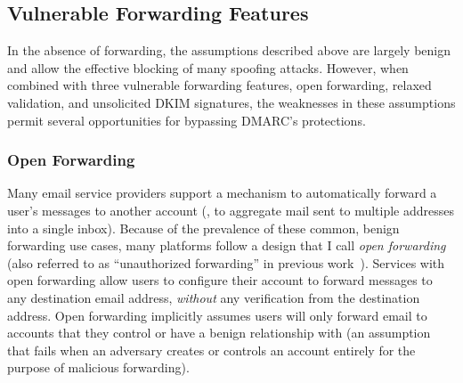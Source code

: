 \subsection{Vulnerable Forwarding Features}
\label{subsec:fwding_vuln}
In the absence of forwarding, the assumptions described above are
largely benign and allow the effective blocking of many spoofing
attacks.  However, when combined with three vulnerable forwarding
features, open forwarding, relaxed validation, and unsolicited DKIM signatures, the weaknesses in
these assumptions permit several opportunities for bypassing DMARC's
protections.



\subsubsection{Open Forwarding}
\label{subsubsec:open_forwarding}
Many email service providers support a mechanism to automatically
forward a user's messages to another account (\eg, to aggregate mail
sent to multiple addresses into a single inbox).  Because of the
prevalence of these common, benign forwarding use cases, many
platforms follow a design that I call \emph{open forwarding} (also
referred to as ``unauthorized forwarding'' in previous work~\cite{shen2020weak}).  Services with open forwarding allow users
to configure their account to forward messages to any destination
email address, \textit{without} any verification from the destination
address.  Open forwarding implicitly assumes users will only forward
email to accounts that they control or have a benign relationship with
(an assumption that fails when an adversary creates or controls an account
entirely for the purpose of malicious forwarding).

